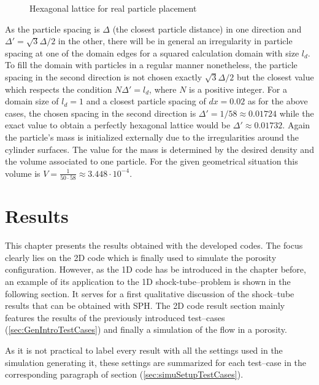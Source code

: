 \documentclass{report}
\begin{document}
\begin{itemize}
\begin{figure}[!htbp]
  \centering
  \caption{Hexagonal lattice for real particle placement}
  \label{fig:HexagonalLattice}
\end{figure}

As the particle spacing is $\Delta$ (the closest particle distance) in one direction and $\Delta'=\sqrt{3}\Delta/2$ in the other, there will be in general an irregularity in particle spacing at one of the domain edges for a squared calculation domain with size $l_d$. To fill the domain with particles in a regular manner nonetheless, the particle spacing in the second direction is not chosen exactly $\sqrt{3}\Delta/2$ but the closest value which respects the condition $N \Delta'=l_d$, where $N$ is a positive integer. For a domain size of $l_d=1$ and a closest particle spacing of $dx=0.02$ as for the above cases, the chosen spacing in the second direction is $\Delta'=1/58\approx0.01724$ while the exact value to obtain a perfectly hexagonal lattice would be $\Delta'\approx0.01732$. 
Again the particle's mass is initialized externally due to the irregularities around the cylinder surfaces. The value for the mass is determined by the desired density and the volume associated to one particle. For the given geometrical situation this volume is $V=\frac{1}{50\cdot58}\approx3.448\cdot10^{-4}$.

\end{itemize}



\chapter{Results}
\label{sec:Results}
This chapter presents the results obtained with the developed codes. The focus clearly lies on the 2D code which is finally used to simulate the porosity configuration. However, as the 1D code has be introduced in the chapter before, an example of its application to the 1D shock-tube--problem is shown in the following section. It serves for a first qualitative discussion of the shock--tube results that can be obtained with SPH.
The 2D code result section mainly features the results of the previously introduced test--cases (\ref{sec:GenIntroTestCases}) and finally a simulation of the flow in a porosity.

As it is not practical to label every result with all the settings used in the simulation generating it, these settings are summarized for each test--case in the corresponding paragraph of section (\ref{sec:simuSetupTestCases}).
\end{document}
